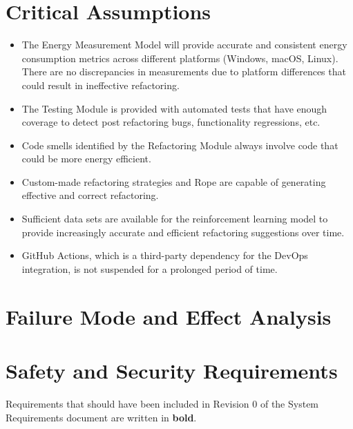 \documentclass{article}
\begin{document}
\section{Critical Assumptions}

\begin{itemize}
    \item The Energy Measurement Model will provide accurate and consistent energy consumption metrics across different platforms (Windows, macOS, Linux). There are no discrepancies in measurements due to platform differences that could result in ineffective refactoring.
    \item The Testing Module is provided with automated tests that have enough coverage to detect post refactoring bugs, functionality regressions, etc.
    \item Code smells identified by the Refactoring Module always involve code that could be more energy efficient.
    \item Custom-made refactoring strategies and Rope are capable of generating effective and correct refactoring.
    \item Sufficient data sets are available for the reinforcement learning model to provide increasingly accurate and efficient refactoring suggestions over time.
    \item GitHub Actions, which is a third-party dependency for the DevOps integration, is not suspended for a prolonged period of time.
\end{itemize}

\section{Failure Mode and Effect Analysis}


\section{Safety and Security Requirements}
Requirements that should have been included in Revision 0 of the System Requirements document are written in \textbf{bold}.
\end{document}
